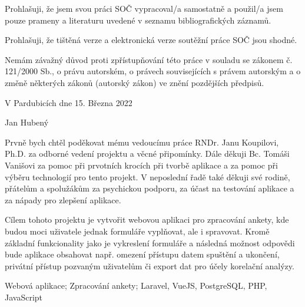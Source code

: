 
\noindent Prohlašuji, že jsem svou práci SOČ vypracoval/a samostatně a použil/a jsem pouze prameny a literaturu uvedené v seznamu bibliografických záznamů.

\noindent Prohlašuji, že tištěná verze a elektronická verze soutěžní práce SOČ jsou shodné.

\noindent Nemám závažný důvod proti zpřístupňování této práce v souladu se zákonem č. 121/2000 Sb., o právu autorském, o právech souvisejících s právem autorským a o změně některých zákonů (autorský zákon) ve znění pozdějších předpisů.  

\vspace{24 pt}

\noindent V Pardubicích dne 15. Března 2022 \dotfill{} 

\hspace{8cm} Jan Hubený

\cleardoublepage

\vspace*{0.8\textheight}

\noindent
Prvně bych chtěl poděkovat mému vedoucímu práce RNDr. Janu Koupilovi, Ph.D. za odborné vedení projektu a věcné připomínky. Dále děkuji Bc. Tomáši Vanišovi za pomoc při prvotních krocích při tvorbě aplikace a za pomoc při výběru technologií pro tento projekt. V neposlední řadě také děkuji své rodině, přátelům a spolužákům za psychickou podporu, za účast na testování aplikace a za nápady pro zlepšení aplikace.

\cleardoublepage


\noindent 
Cílem tohoto projektu je vytvořit webovou aplikaci pro zpracování ankety, kde budou moci uživatele jednak formuláře vyplňovat, ale i spravovat. Kromě základní funkcionality jako je vykreslení formuláře a následná možnost odpovědi bude aplikace obsahovat např. omezení přístupu datem spuštění a ukončení, privátní přístup pozvaným uživatelům či export dat pro účely korelační analýzy.

\vspace{18pt}


\noindent Webová aplikace; Zpracování ankety; Laravel, VueJS, PostgreSQL, PHP, JavaScript

